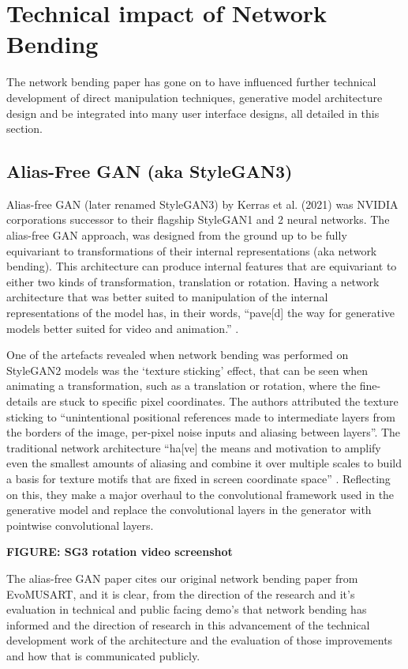 \section{Technical impact of Network Bending}

The network bending paper has gone on to have influenced further technical development of direct manipulation techniques, generative model architecture design and be integrated into many user interface designs, all detailed in this section.

 \subsection{Alias-Free GAN (aka StyleGAN3)}

 Alias-free GAN (later renamed StyleGAN3) by Kerras et al. (2021) was NVIDIA corporations successor to their flagship StyleGAN1 and 2 neural networks. 
 The alias-free GAN approach, was designed from the ground up to be fully equivariant to transformations of their internal representations (aka network bending). 
 This architecture can produce internal features that are equivariant to either two kinds of transformation, translation or rotation. 
 Having a network architecture that was better suited to manipulation of the internal representations of the model has, in their words, “pave[d] the way for generative models better suited for video and animation.” \citep{karras2021alias}.

 One of the artefacts revealed when network bending was performed on StyleGAN2 models was the ‘texture sticking’ effect, that can be seen when animating a transformation, such as a translation or rotation, where the fine-details are stuck to specific pixel coordinates. 
 The authors attributed the texture sticking to “unintentional positional references made to intermediate layers from the borders of the image, per-pixel noise inputs and aliasing between layers”. 
 The traditional network architecture “ha[ve] the means and motivation to amplify even the smallest amounts of aliasing and combine it over multiple scales to build a basis for texture motifs that are fixed in screen coordinate space” \citep{karras2021alias}.
 Reflecting on this, they make a major overhaul to the convolutional framework used in the generative model and replace the convolutional layers in the generator with pointwise convolutional layers.

 \textbf{FIGURE: SG3 rotation video screenshot}

 The alias-free GAN paper cites our original network bending paper from EvoMUSART, and it is clear, from the direction of the research and it’s evaluation in technical and public facing demo’s that network bending has informed and the direction of research in this advancement of the technical development work of the architecture and the evaluation of those improvements and how that is communicated publicly. 

